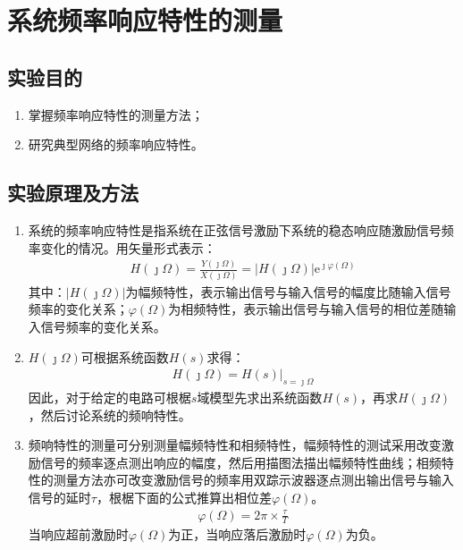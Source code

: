 \chapter{系统频率响应特性的测量}%
\label{cha:系统频率响应特性的测量}
\section{实验目的}%
\label{sec:实验目的\arabic{chapter}}
\begin{enumerate}
	\item 掌握频率响应特性的测量方法；
	\item 研究典型网络的频率响应特性。
\end{enumerate}
\section{实验原理及方法}%
\label{sec:实验原理及方法\arabic{chapter}}
\begin{enumerate}
	\item 系统的频率响应特性是指系统在正弦信号激励下系统的稳态响应随激励信号频率变化的情况。用矢量形式表示：
		\begin{align}
			H(\jmath\Omega) = \frac{Y(\jmath\Omega)}{X(\jmath\Omega)} = |H(\jmath\Omega)| \text{e}^{\jmath\varphi(\Omega)}
		\end{align}
		其中：$ |H(\jmath\Omega)| $为幅频特性，表示输出信号与输入信号的幅度比随输入信号频率的变化关系；$ \varphi(\Omega) $为相频特性，表示输出信号与输入信号的相位差随输入信号频率的变化关系。
	\item $ H(\jmath\Omega) $可根据系统函数$ H(s) $求得：
		\begin{align}
			H(\jmath\Omega)=H(s)\Big|_{s=\jmath\Omega}
		\end{align}
		因此，对于给定的电路可根椐$ s $域模型先求出系统函数$ H(s) $，再求$ H(\jmath\Omega) $，然后讨论系统的频响特性。
	\item 频响特性的测量可分别测量幅频特性和相频特性，幅频特性的测试采用改变激励信号的频率逐点测出响应的幅度，然后用描图法描出幅频特性曲线；相频特性的测量方法亦可改变激励信号的频率用双踪示波器逐点测出输出信号与输入信号的延时$ \tau $，根椐下面的公式推算出相位差$ \varphi(\Omega) $。
		\begin{align}
			\varphi(\Omega)=2\pi\times \frac{\tau}{T}
		\end{align}
		当响应超前激励时$ \varphi(\Omega) $为正，当响应落后激励时$ \varphi(\Omega) $为负。
\end{enumerate}
